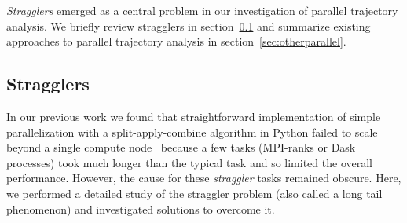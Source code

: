 \label{background}

\emph{Stragglers} emerged as a central problem in our investigation of parallel trajectory analysis. We briefly review stragglers in section~\ref{sec:stragglers} and summarize existing approaches to parallel trajectory analysis in section~\ref{sec:otherparallel}.

\subsection{Stragglers}
\label{sec:stragglers}


In our previous work we found that straightforward implementation of simple parallelization with a split-apply-combine algorithm in Python failed to scale beyond a single compute node~\cite{Khoshlessan:2017ab} because a few tasks (MPI-ranks or Dask~\citep{Rocklin:2015aa} processes) took much longer than the typical task and so limited the overall performance.
However, the cause for these \emph{straggler} tasks remained obscure.
Here, we performed a detailed study of the straggler problem (also called a long tail phenomenon) and investigated solutions to overcome it.

